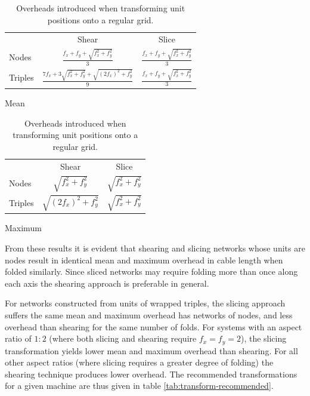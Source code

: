 			\begin{table}
				\begin{subtable}[b]{\linewidth}
					\center
					\begin{tabular}{l c c}
						\toprule
						& Shear & Slice \\
						\addlinespace
						Nodes &
							$\frac{f_x + f_y + \sqrt{f_x^2 + f_y^2}}{3}$ &
							$\frac{f_x + f_y + \sqrt{f_x^2 + f_y^2}}{3}$ \\
						\addlinespace
						Triples &
							$\frac{7f_x + 3\sqrt{f_x^2 + f_y^2} + \sqrt{(2f_x)^2 + f_y^2}}{9}$ &
							$\frac{f_x + f_y + \sqrt{f_x^2 + f_y^2}}{3}$ \\
						\bottomrule
					\end{tabular}
					
					\caption{Mean}
					\label{tab:transform-overhead-mean}
				\end{subtable}
				
				\vspace{1em}
				
				\begin{subtable}[b]{\linewidth}
					\center
					\begin{tabular}{l c c}
						\toprule
						& Shear & Slice \\
						\addlinespace
						Nodes &
							$\sqrt{f_x^2 + f_y^2}$ &
							$\sqrt{f_x^2 + f_y^2}$ \\
						\addlinespace
						Triples &
							$\sqrt{(2f_x)^2 + f_y^2}$ &
							$\sqrt{f_x^2 + f_y^2}$ \\
						\bottomrule
					\end{tabular}
					
					\caption{Maximum}
					\label{tab:transform-overhead-max}
				\end{subtable}
				
				\caption{Overheads introduced when transforming unit positions onto a
				regular grid.}
				\label{tab:transform-overhead}
			\end{table}
			
			From these results it is evident that shearing and slicing networks
			whose units are nodes result in identical mean and maximum overhead in
			cable length when folded similarly. Since sliced networks may require
			folding more than once along each axis the shearing approach is
			preferable in general.
			
			For networks constructed from units of wrapped triples, the slicing
			approach suffers the same mean and maximum overhead has networks of
			nodes, and less overhead than shearing for the same number of folds. For
			systems with an aspect ratio of $1:2$ (where both slicing and shearing
			require $f_x = f_y = 2$), the slicing transformation yields lower mean
			and maximum overhead than shearing. For all other aspect ratios (where
			slicing requires a greater degree of folding) the shearing technique
			produces lower overhead. The recommended transformations for a given
			machine are thus given in table \ref{tab:transform-recommended}.
			
